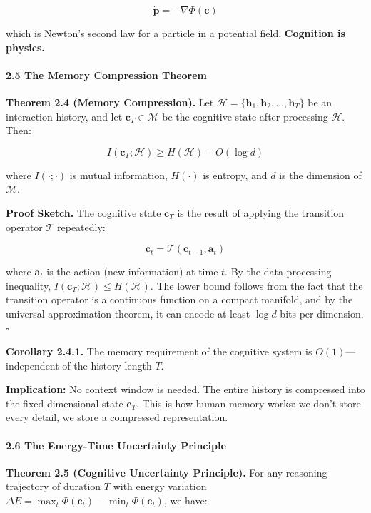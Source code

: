 \documentclass[
  11pt,
  a4paper,
]{article}
\begin{document}
\[\dot{\mathbf{p}} = -\nabla \Phi(\mathbf{c})\]

which is Newton's second law for a particle in a potential field.
\textbf{Cognition is physics.}

\paragraph{2.5 The Memory Compression
Theorem}\label{the-memory-compression-theorem}

\textbf{Theorem 2.4 (Memory Compression).} Let
\(\mathcal{H} = \{\mathbf{h}_1, \mathbf{h}_2, \dots, \mathbf{h}_T\}\) be
an interaction history, and let \(\mathbf{c}_T \in \mathcal{M}\) be the
cognitive state after processing \(\mathcal{H}\). Then:

\[I(\mathbf{c}_T; \mathcal{H}) \geq H(\mathcal{H}) - O(\log d)\]

where \(I(\cdot; \cdot)\) is mutual information, \(H(\cdot)\) is
entropy, and \(d\) is the dimension of \(\mathcal{M}\).

\textbf{Proof Sketch.} The cognitive state \(\mathbf{c}_T\) is the
result of applying the transition operator \(\mathcal{T}\) repeatedly:

\[\mathbf{c}_t = \mathcal{T}(\mathbf{c}_{t-1}, \mathbf{a}_t)\]

where \(\mathbf{a}_t\) is the action (new information) at time \(t\). By
the data processing inequality,
\(I(\mathbf{c}_T; \mathcal{H}) \leq H(\mathcal{H})\). The lower bound
follows from the fact that the transition operator is a continuous
function on a compact manifold, and by the universal approximation
theorem, it can encode at least \(\log d\) bits per dimension.
\(\square\)

\textbf{Corollary 2.4.1.} The memory requirement of the cognitive system
is \(O(1)\)---independent of the history length \(T\).

\textbf{Implication:} No context window is needed. The entire history is
compressed into the fixed-dimensional state \(\mathbf{c}_T\). This is
how human memory works: we don't store every detail, we store a
compressed representation.

\paragraph{2.6 The Energy-Time Uncertainty
Principle}\label{the-energy-time-uncertainty-principle}

\textbf{Theorem 2.5 (Cognitive Uncertainty Principle).} For any
reasoning trajectory of duration \(T\) with energy variation
\(\Delta E = \max_t \Phi(\mathbf{c}_t) - \min_t \Phi(\mathbf{c}_t)\), we
have:
\end{document}
